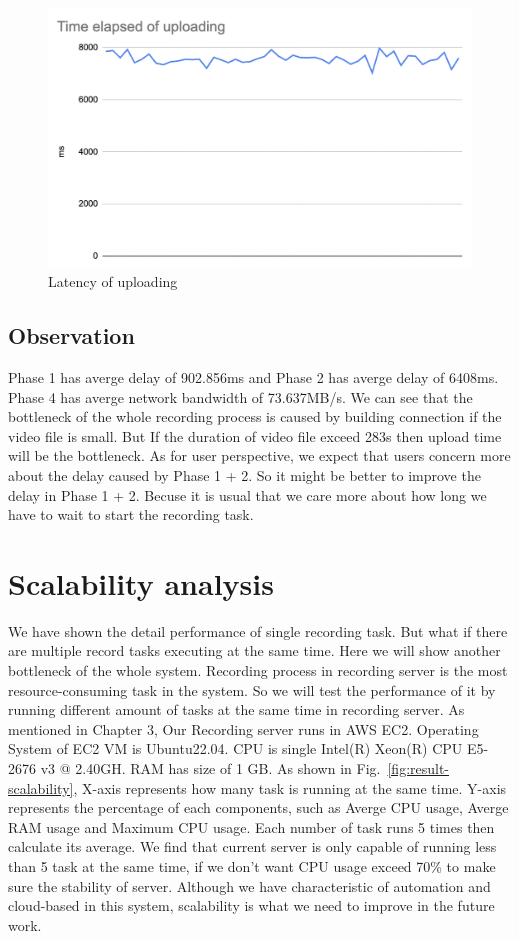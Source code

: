 \begin{figure}[H]
    \centering
    \includegraphics[width=\textwidth]{figsrc/result-p4-1.png}
    \caption{Latency of uploading\label{fig:result-p4-1}}
\end{figure}

\subsection{Observation}
Phase 1 has averge delay of 902.856ms and Phase 2 has averge delay of 6408ms. Phase 4 has averge network bandwidth of 73.637MB/s. We can see that the bottleneck of the whole recording process is caused by building connection if the video file is small. But If the duration of video file exceed 283s then upload time will be the bottleneck. As for user perspective, we expect that users concern more about the delay caused by Phase 1 + 2. So it might be better to improve the delay in Phase 1 + 2. Becuse it is usual that we care more about how long we have to wait to start the recording task.

\section{Scalability analysis}
We have shown the detail performance of single recording task. But what if there are multiple record tasks executing at the same time. Here we will show another bottleneck of the whole system. Recording process in recording server is the most resource-consuming task in the system. So we will test the performance of it by running different amount of tasks at the same time in recording server. As mentioned in Chapter 3, Our Recording server runs in AWS EC2. Operating System of EC2 VM is Ubuntu22.04. CPU is single Intel(R) Xeon(R) CPU E5-2676 v3 @ 2.40GH. RAM has size of 1 GB. As shown in Fig.~\ref{fig:result-scalability}, X-axis represents how many task is running at the same time. Y-axis represents the percentage of each components, such as Averge CPU usage, Averge RAM usage and Maximum CPU usage. Each number of task runs 5 times then calculate its average. We find that current server is only capable of running less than 5 task at the same time, if we don’t want CPU usage exceed 70\% to make sure the stability of server. Although we have characteristic of automation and cloud-based in this system, scalability is what we need to improve in the future work.

